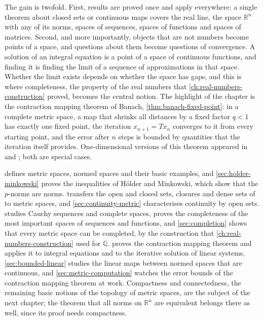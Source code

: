 The gain is twofold. First, results are proved once and apply everywhere: a single theorem about closed sets or continuous maps covers the real line, the space $\mathbb R^n$ with any of its norms, spaces of sequences, spaces of functions and spaces of matrices. Second, and more importantly, objects that are not numbers become points of a space, and questions about them become questions of convergence. A solution of an integral equation is a point of a space of continuous functions, and finding it is finding the limit of a sequence of approximations in that space. Whether the limit exists depends on whether the space has gaps, and this is where completeness, the property of the real numbers that \cref{ch:real-numbers-construction} proved, becomes the central notion. The highlight of the chapter is the contraction mapping theorem of Banach, \cref{thm:banach-fixed-point}: in a complete metric space, a map that shrinks all distances by a fixed factor $q<1$ has exactly one fixed point, the iteration $x_{n+1}=Tx_n$ converges to it from every starting point, and the error after $n$ steps is bounded by quantities that the iteration itself provides. One-dimensional versions of this theorem appeared in  and ; both are special cases.

 defines metric spaces, normed spaces and their basic examples, and \cref{sec:holder-minkowski} proves the inequalities of H\"older and Minkowski, which show that the $p$-norms are norms.  transfers the open and closed sets, closures and dense sets of  to metric spaces, and \cref{sec:continuity-metric} characterises continuity by open sets.  studies Cauchy sequences and complete spaces, proves the completeness of the most important spaces of sequences and functions, and \cref{sec:completion} shows that every metric space can be completed, by the construction that \cref{ch:real-numbers-construction} used for $\mathbb Q$.  proves the contraction mapping theorem and applies it to integral equations and to the iterative solution of linear systems, \cref{sec:bounded-linear} studies the linear maps between normed spaces that are continuous, and \cref{sec:metric-computation} watches the error bounds of the contraction mapping theorem at work. Compactness and connectedness, the remaining basic notions of the topology of metric spaces, are the subject of the next chapter; the theorem that all norms on $\mathbb R^n$ are equivalent belongs there as well, since its proof needs compactness.

